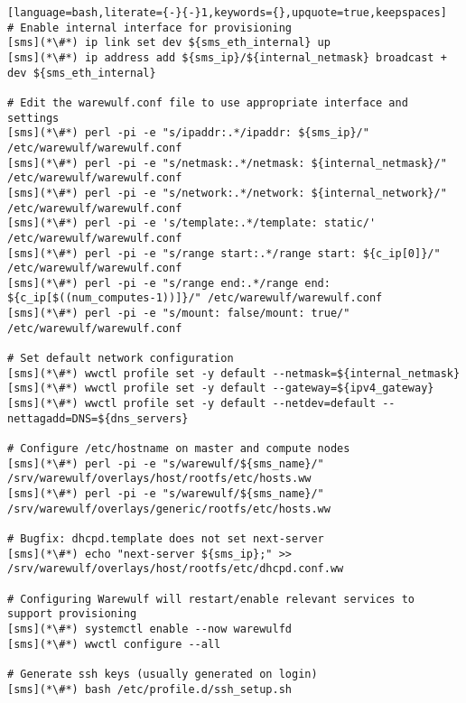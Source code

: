 \begin{lstlisting}[language=bash,literate={-}{-}1,keywords={},upquote=true,keepspaces]
# Enable internal interface for provisioning
[sms](*\#*) ip link set dev ${sms_eth_internal} up
[sms](*\#*) ip address add ${sms_ip}/${internal_netmask} broadcast + dev ${sms_eth_internal}

# Edit the warewulf.conf file to use appropriate interface and settings
[sms](*\#*) perl -pi -e "s/ipaddr:.*/ipaddr: ${sms_ip}/" /etc/warewulf/warewulf.conf
[sms](*\#*) perl -pi -e "s/netmask:.*/netmask: ${internal_netmask}/" /etc/warewulf/warewulf.conf
[sms](*\#*) perl -pi -e "s/network:.*/network: ${internal_network}/" /etc/warewulf/warewulf.conf
[sms](*\#*) perl -pi -e 's/template:.*/template: static/' /etc/warewulf/warewulf.conf
[sms](*\#*) perl -pi -e "s/range start:.*/range start: ${c_ip[0]}/" /etc/warewulf/warewulf.conf
[sms](*\#*) perl -pi -e "s/range end:.*/range end: ${c_ip[$((num_computes-1))]}/" /etc/warewulf/warewulf.conf
[sms](*\#*) perl -pi -e "s/mount: false/mount: true/" /etc/warewulf/warewulf.conf

# Set default network configuration
[sms](*\#*) wwctl profile set -y default --netmask=${internal_netmask}
[sms](*\#*) wwctl profile set -y default --gateway=${ipv4_gateway}
[sms](*\#*) wwctl profile set -y default --netdev=default --nettagadd=DNS=${dns_servers}

# Configure /etc/hostname on master and compute nodes
[sms](*\#*) perl -pi -e "s/warewulf/${sms_name}/" /srv/warewulf/overlays/host/rootfs/etc/hosts.ww
[sms](*\#*) perl -pi -e "s/warewulf/${sms_name}/" /srv/warewulf/overlays/generic/rootfs/etc/hosts.ww

# Bugfix: dhcpd.template does not set next-server
[sms](*\#*) echo "next-server ${sms_ip};" >> /srv/warewulf/overlays/host/rootfs/etc/dhcpd.conf.ww

# Configuring Warewulf will restart/enable relevant services to support provisioning
[sms](*\#*) systemctl enable --now warewulfd
[sms](*\#*) wwctl configure --all

# Generate ssh keys (usually generated on login)
[sms](*\#*) bash /etc/profile.d/ssh_setup.sh
\end{lstlisting}

